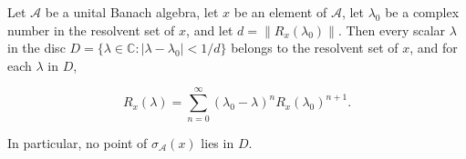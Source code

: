 Let $\mathcal{A}$ be a unital Banach algebra, let $x$ be an element of $\mathcal{A}$, let $\lambda_0$ be a complex number in the resolvent set of $x$, and let $d = \| R_x(\lambda_0) \|$. Then every scalar $\lambda$ in the disc $D = \{\lambda \in \mathbb{C}: |\lambda - \lambda_0| < 1/d\}$ belongs to the resolvent set of $x$, and for each $\lambda$ in $D$,

$$R_x(\lambda) = \sum_{n=0}^{\infty} (\lambda_0 - \lambda)^n R_x(\lambda_0)^{n+1}.$$

In particular, no point of $\sigma_{\mathcal{A}}(x)$ lies in $D$.
